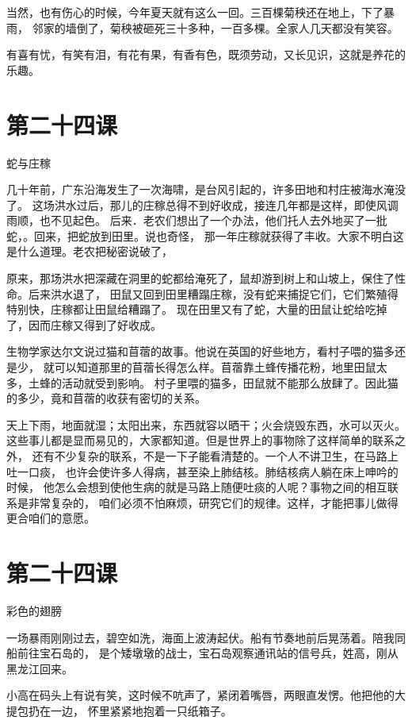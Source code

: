 \documentclass[12pt,UTF8]{ctexbook}
\begin{document}
当然，也有伤心的时候，今年夏天就有这么一回。三百棵菊秧还在地上，下了暴雨，
邻家的墙倒了，菊秧被砸死三十多种，一百多棵。全家人几天都没有笑容。

有喜有忧，有笑有泪，有花有果，有香有色，既须劳动，又长见识，这就是养花的乐趣。

\section{第二十四课}

蛇与庄稼

几十年前，广东沿海发生了一次海啸，是台风引起的，许多田地和村庄被海水淹没了。
这场洪水过后，那儿的庄稼总得不到好收成，接连几年都是这样，即使风调雨顺，也不见起色。
后来．老农们想出了一个办法，他们托人去外地买了一批蛇，。回来，把蛇放到田里。说也奇怪，
那一年庄稼就获得了丰收。大家不明白这是什么道理。老农把秘密说破了，

原来，那场洪水把深藏在洞里的蛇都给淹死了，鼠却游到树上和山坡上，保住了性命。后来洪水退了，
田鼠又回到田里糟蹋庄稼，没有蛇来捕捉它们，它们繁殖得特别快，庄稼都让田鼠给糟蹋了。
现在田里又有了蛇，大量的田鼠让蛇给吃掉了，因而庄稼又得到了好收成。

生物学家达尔文说过猫和苜蓿的故事。他说在英国的好些地方，看村子喂的猫多还是少，
就可以知道那里的苜蓿长得怎么样。苜蓿靠土蜂传播花粉，地里田鼠太多，土蜂的活动就受到影响。
村子里喂的猫多，田鼠就不能那么放肆了。因此猫的多少，竟和苜蓿的收获有密切的关系。

天上下雨，地面就湿；太阳出来，东西就容以晒干；火会烧毁东西，水可以灭火。
这些事儿都是显而易见的，大家都知道。但是世界上的事物除了这样简单的联系之外，
还有不少复杂的联系，不是一下子能看清楚的。一个人不讲卫生，在马路上吐一口痰，
也许会使许多人得病，甚至染上肺结核。肺结核病人躺在床上呻吟的时候，
他怎么会想到使他生病的就是马路上随便吐痰的人呢？事物之间的相互联系是非常复杂的，
咱们必须不怕麻烦，研究它们的规律。这样，才能把事儿做得更合咱们的意愿。

\section{第二十四课}

彩色的翅膀

一场暴雨刚刚过去，碧空如洗，海面上波涛起伏。船有节奏地前后晃荡着。陪我同船前往宝石岛的，
是个矮墩墩的战士，宝石岛观察通讯站的信号兵，姓高，刚从黑龙江回来。

小高在码头上有说有笑，这时候不吭声了，紧闭着嘴唇，两眼直发愣。他把他的大提包扔在一边，
怀里紧紧地抱着一只纸箱子。
\end{document}
